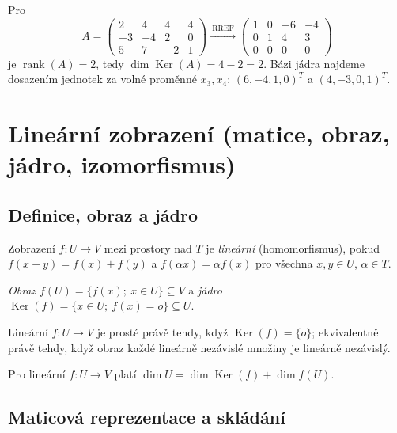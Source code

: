 \documentclass[11pt,a4paper]{article}
\newcommand{\rank}{\operatorname{rank}}
\newcommand{\Ker}{\operatorname{Ker}}
\begin{document}
\begin{priklad}
Pro
\[
  A=\begin{pmatrix}2&4&4&4\\-3&-4&2&0\\5&7&-2&1\end{pmatrix}
  \xrightarrow{\ \mathrm{RREF}\ }
  \begin{pmatrix}1&0&-6&-4\\0&1&4&3\\0&0&0&0\end{pmatrix}
\]
je $\rank(A)=2$, tedy $\dim\Ker(A)=4-2=2$. Bázi jádra najdeme dosazením jednotek za volné proměnné $x_3,x_4$: $(6,-4,1,0)^T$ a $(4,-3,0,1)^T$.
\end{priklad}

\section{Lineární zobrazení (matice, obraz, jádro, izomorfismus)}

\subsection{Definice, obraz a jádro}

\begin{definice}
Zobrazení $f:U\to V$ mezi prostory nad $T$ je \emph{lineární} (homomorfismus), pokud $f(x+y)=f(x)+f(y)$ a $f(\alpha x)=\alpha f(x)$ pro všechna $x,y\in U$, $\alpha\in T$.
\end{definice}

\begin{definice}
\emph{Obraz} $f(U)=\{f(x);\ x\in U\}\subseteq V$ a \emph{jádro} $\Ker(f)=\{x\in U;\ f(x)=o\}\subseteq U$.
\end{definice}

\begin{veta}
Lineární $f:U\to V$ je prosté právě tehdy, když $\Ker(f)=\{o\}$; ekvivalentně právě tehdy, když obraz každé lineárně nezávislé množiny je lineárně nezávislý.
\end{veta}

\begin{veta}
Pro lineární $f:U\to V$ platí $\dim U=\dim\Ker(f)+\dim f(U)$.
\end{veta}

\subsection{Maticová reprezentace a skládání}
\end{document}
